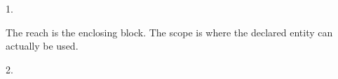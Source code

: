 
1.

The reach is the enclosing block.
The scope is where the declared entity can actually be used.

2. 